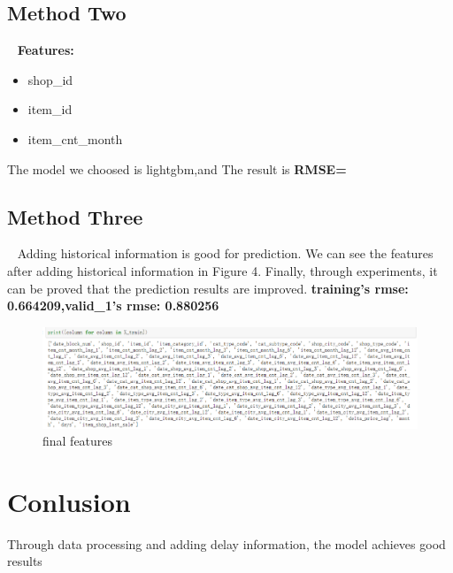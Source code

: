\documentclass{amsart}
\begin{document}
\subsection{Method Two}
\ 
\newline
\textbf{Features:}\par
  \begin{itemize}
    \item shop_id
    \item item_id
    \item item_cnt_month
  \end{itemize}
  The model we choosed is lightgbm,and The result is \textbf{RMSE=}

\subsection{Method Three}\par
\ 
\newline
Adding historical information is good for prediction. We can see the features after adding historical information in Figure 4.
Finally, through experiments, it can be proved that the prediction results are improved.
\textbf{training's rmse: 0.664209,valid_1's rmse: 0.880256}
\begin{figure}
    \includegraphics[scale=0.3]{picture/data_16.eps}
    \caption{final features}\label{fig:4}
\end{figure}
\section{Conlusion}
Through data processing and adding delay information, the model achieves good results
\end{document}
